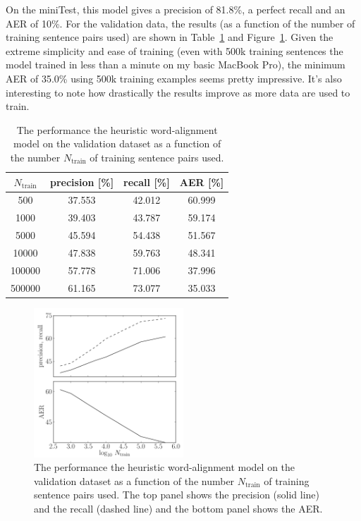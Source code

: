 \documentclass[11pt]{article}
\newcommand{\fig}[1]{Figure~\ref{fig:#1}}
\newcommand{\figlabel}[1]{\label{fig:#1}}
\newcommand{\code}[1]{{\sffamily #1}}
\begin{document}
On the \code{miniTest}, this model gives a precision of 81.8\%, a perfect
recall and an AER of 10\%.
For the validation data, the results (as a function of the number of training
sentence pairs used) are shown in Table~\ref{tab:heuristic} and
\fig{heuristic}.
Given the extreme simplicity and ease of training (even with 500k training
sentences the model trained in less than a minute on my basic MacBook Pro),
the minimum AER of 35.0\% using 500k training examples seems pretty impressive.
It's also interesting to note how drastically the results improve as more data
are used to train.

\begin{table}[htbp]
\begin{center}
\begin{tabular}{c ccc}
\toprule
$N_\mathrm{train}$ & precision [\%] & recall [\%] & AER [\%] \\\midrule
500 & 37.553 & 42.012 & 60.999 \\
1000 & 39.403 & 43.787 & 59.174 \\
5000 & 45.594 & 54.438 & 51.567 \\
10000 & 47.838 & 59.763 & 48.341 \\
100000 & 57.778 & 71.006 & 37.996 \\
500000 & 61.165 & 73.077 & 35.033 \\
\bottomrule
\end{tabular}
\end{center}
\caption{%
The performance the heuristic word-alignment model on the validation dataset
as a function of the number $N_\mathrm{train}$ of training sentence pairs used.
\label{tab:heuristic}}
\end{table}

\begin{figure}[htbp]
\begin{center}
    \includegraphics[width=0.5\textwidth]{heuristic.pdf}
\end{center}
\caption{%
The performance the heuristic word-alignment model on the validation dataset
as a function of the number $N_\mathrm{train}$ of training sentence pairs used.
The top panel shows the precision (solid line) and the recall (dashed line)
and the bottom panel shows the AER.
\figlabel{heuristic}}
\end{figure}
\end{document}
